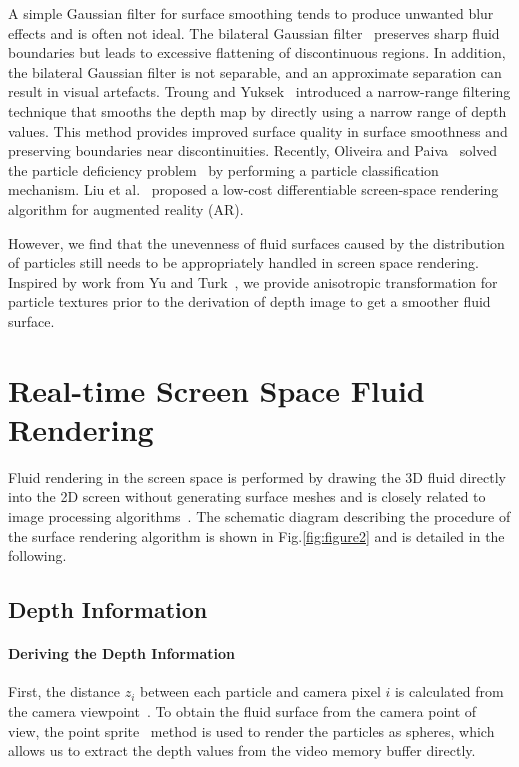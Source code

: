 \documentclass[times,twocolumn,final]{elsarticle}
\begin{document}
A simple Gaussian filter for surface smoothing\cite{ref:ref2} tends to produce unwanted blur effects and is often not ideal. The bilateral Gaussian filter~\cite{ref:ref3,neto2017real} preserves sharp fluid boundaries but leads to excessive flattening of discontinuous regions. In addition, the bilateral Gaussian filter is not separable, and an approximate separation can result in visual artefacts. Troung and Yuksek~\cite{truong2018narrow} introduced a narrow-range filtering technique that smooths the depth map by directly using a narrow range of depth values. This method provides improved surface quality in surface smoothness and preserving boundaries near discontinuities.
Recently, Oliveira and Paiva~\cite{oliveira2022narrow} solved the particle deficiency problem~\cite{truong2018narrow} by performing a particle classification mechanism. Liu et al.~\cite{liu2022real} proposed a low-cost differentiable screen-space rendering algorithm for augmented reality (AR).

However, we find that the unevenness of fluid surfaces caused by the distribution of particles still needs to be appropriately handled in screen space rendering. Inspired by work from Yu and Turk~\cite{yu2013reconstructing}, we provide anisotropic transformation for particle textures prior to the derivation of depth image to get a smoother fluid surface.

\section{Real-time Screen Space Fluid Rendering}
Fluid rendering in the screen space is performed by drawing the 3D fluid directly into the 2D screen without generating surface meshes and is closely related to image processing algorithms~\cite{ref:ref3}. The schematic diagram describing the procedure of the surface rendering algorithm is shown in Fig.\ref{fig:figure2} and is detailed in the following.

\subsection{Depth Information}

\paragraph{Deriving the Depth Information}
First, the distance $z_i$ between each particle and camera pixel $i$ is calculated from the camera viewpoint~\cite{ref:ref20}.
To obtain the fluid surface from the camera point of view, the point sprite~\cite{ref:ref21} method is used to render the particles as spheres, which allows us to extract the depth values from the video memory buffer directly.
\end{document}
